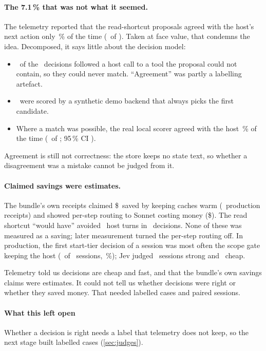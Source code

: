 \paragraph{The 7.1\,\% that was not what it seemed.} The telemetry reported that the read-shortcut proposals agreed
with the host's next action only \ObAllRate\,\% of the time (\ObAllMatch\ of \ObAllN). Taken at face value, that
condemns the idea. Decomposed, it says little about the decision model:
\begin{itemize}
  \item \ObUnmatchN\ of the \ObAllN\ decisions followed a host call to a tool the proposal could not contain, so they
    could never match. ``Agreement'' was partly a labelling artefact.
  \item \ObDemoN\ were scored by a synthetic demo backend that always picks the first candidate.
  \item Where a match was possible, the real local scorer agreed with the host \ObCandRate\,\% of the time
    (\ObCandMatch\ of \ObCandN; 95\,\% CI \ObCandCI).
\end{itemize}
Agreement is still not correctness: the store keeps no state text, so whether a disagreement was a mistake cannot be
judged from it.

\paragraph{Claimed savings were estimates.} The bundle's own receipts claimed \$\ObKeepaliveUSD\ saved by keeping
caches warm (\ObKeepaliveN\ production receipts) and showed per-step routing to Sonnet costing money (\$\ObCheaperUSD).
The read shortcut ``would have'' avoided \ObClaimTurns\ host turns in \ObClaimDecisions\ decisions. None of these was
measured as a saving; later measurement turned the per-step routing off. In production, the first start-tier decision
of a session was most often the scope gate keeping the host (\ObStScope\ of \ObStTotal\ sessions,
\ObStScopePct\,\%); Jev judged \ObStJevStrong\ sessions strong and \ObStJevCheap\ cheap.

\begin{keyidea}
Telemetry told us decisions are cheap and fast, and that the bundle's own savings claims were estimates. It could not
tell us whether decisions were right or whether they saved money. That needed labelled cases and paired sessions.
\end{keyidea}

\paragraph{What this left open} Whether a decision is right needs a label that telemetry does not keep, so the next
stage built labelled cases (\cref{sec:judges}).
